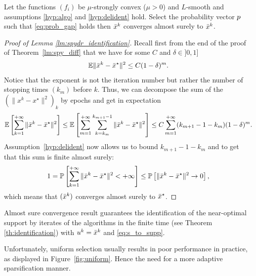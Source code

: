 \begin{lemma}\label{lm:spydr_identification}
Let the functions $(f_i)$ be $\mu$-strongly convex ($\mu>0$) and $L$-smooth and assumptions \ref{hyp:algo} and \ref{hyp:delident} hold. Select the probability vector ${p}$ such that \eqref{eq:prob_gap} holds then $\bar{x}^k$ converges almost surely to $\bar{x}^k$.
\end{lemma}
\begin{proof}[Proof of Lemma \ref{lm:spydr_identification}]
Recall first from the end of the proof of Theorem~\ref{lm:spy_diff} that we have
for some $C$ and $\delta\in]0,1]$
\begin{equation}\label{eq:recall}
    \mathbb{E}\|\bar{x}^k - \bar{x}^\star\|^2 \leq C (1-\delta)^m.
\end{equation}
Notice that the exponent is not the iteration number but rather the number of stopping times $(k_m)$ before $k$. Thus, we can decompose the sum of the  
$( \|x^k - x^\star \|^2 )_k$ by epochs and get in expectation 
\begin{align*}
    \mathbb{E}\left[ \sum_{k=1}^{+\infty}  \|\bar{x}^k - \bar{x}^\star \|^2 \right] 
    \leq \mathbb{E}\left[ \sum_{m=1}^{+\infty} \sum_{k=k_m}^{k_{m+1}-1} \|\bar{x}^k -\bar{x}^\star \|^2 \right]
    \leq C \sum_{m=1}^{+\infty} (k_{m+1}-1 - k_m) (1-\delta)^m.
\end{align*}
Assumption~\ref{hyp:delident} now allows us to bound $k_{m+1}-1 - k_m$ and to get that this sum is finite almost surely:
\[
1 = \mathbb{P}\left[ \sum_{k=1}^{+\infty}  \|\bar{x}^k - \bar{x}^\star \|^2 < +\infty \right] \leq \mathbb{P}\left[ \|\bar{x}^k - \bar{x}^\star \|^2 \to 0 \right],
\]
which means that $(\bar{x}^k)$ converges almost surely to $\bar{x}^\star$.
\end{proof}

Almost sure convergence result guarantees the identification of the near-optimal support by iterates of the algorithms in the finite time (see Theorem \ref{th:identification}) with $u^k = \bar{x}^k$ and \eqref{eq:s_to_supp}. 


Unfortunately, uniform selection usually results in poor performance in practice, as displayed in Figure~\ref{fig:uniform}. Hence the need for a more adaptive sparsification manner.

